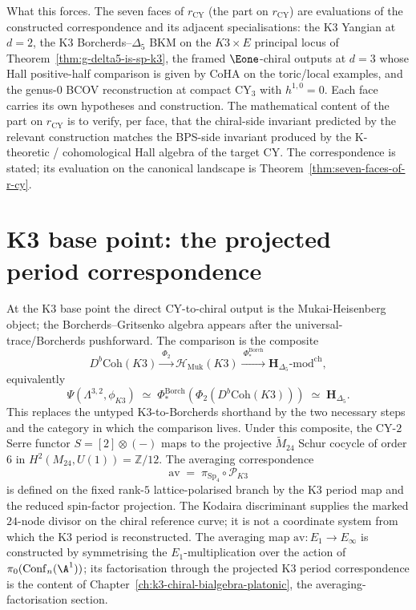 What this forces. The seven faces of $r_{\mathrm{CY}}$ \textup{(}the part on $r_{\mathrm{CY}}$\textup{)} are evaluations of the constructed correspondence and its adjacent specialisations: the K3 Yangian at $d = 2$, the K3 Borcherds--$\Delta_5$ BKM on the $K3 \times E$ principal locus of Theorem~\ref{thm:g-delta5-is-sp-k3}, the framed $\Eone$-chiral outputs at $d = 3$ whose Hall positive-half comparison is given by CoHA on the toric/local examples, and the genus-$0$ BCOV reconstruction at compact CY$_3$ with $h^{1,0} = 0$. Each face carries its own hypotheses and construction. The mathematical content of the part on $r_{\mathrm{CY}}$ is to verify, per face, that the chiral-side invariant predicted by the relevant construction matches the BPS-side invariant produced by the K-theoretic / cohomological Hall algebra of the target CY. The correspondence is stated; its evaluation on the canonical landscape is Theorem~\ref{thm:seven-faces-of-r-cy}.

\section{K3 base point: the projected period correspondence}
\label{sec:cy2ch-phi-at-K3}

\begin{remark}
\label{rem:cy2ch-phi-K3-comparison}
At the K3 base point the direct CY-to-chiral output is the
Mukai-Heisenberg object; the Borcherds--Gritsenko algebra appears after
the universal-trace/Borcherds pushforward. The comparison is the
composite
\[
D^b\mathrm{Coh}(K3)
\xrightarrow{\ \Phi_2\ }
\mathcal H_{\mathrm{Muk}}(K3)
\xrightarrow{\ \Phi^{\mathrm{Borch}}_*\ }
\mathbf H_{\Delta_5}\text{-}\mathrm{mod}^{\mathrm{ch}},
\]
equivalently
\[
\Psi(\Lambda^{3,2},\phi_{K3})
\;\simeq\;
\Phi^{\mathrm{Borch}}_*(\Phi_2(D^b\mathrm{Coh}(K3)))
\;\simeq\;
\mathbf H_{\Delta_5}.
\]
This replaces the untyped K3-to-Borcherds shorthand by the two necessary
steps and the category in which the comparison lives. Under this
composite, the CY-$2$ Serre functor
$S = [2]\otimes(-)$ maps to the projective $\widetilde{M}_{24}$ Schur
cocycle of order $6$ in $H^2(M_{24}, U(1)) = \mathbb Z/12$. The averaging correspondence
\[
\mathrm{av} \;=\; \pi_{\mathrm{Sp}_4}\circ\mathscr P_{K3}
\]
is defined on the fixed rank-\(5\) lattice-polarised branch by the K3 period map and the reduced spin-factor projection. The Kodaira discriminant supplies the marked \(24\)-node divisor on the chiral reference curve; it is not a coordinate system from which the K3 period is reconstructed. The
averaging map $\mathrm{av}: E_1 \to E_\infty$ is constructed by
symmetrising the $E_1$-multiplication over the action of
$\pi_0(\mathrm{Conf}_n(\A^1))$; its factorisation through
the projected K3 period correspondence is the content of
Chapter~\ref{ch:k3-chiral-bialgebra-platonic}, the averaging-factorisation section.
\end{remark}

